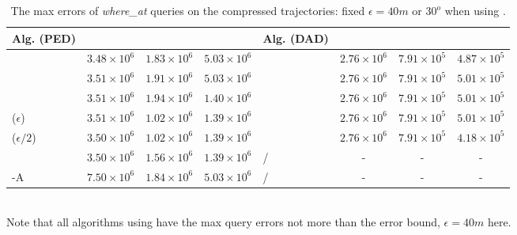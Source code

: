 {\begin{table}
	\caption{\small The max errors of {\emph{where\_at}} queries on the compressed trajectories: fixed $\epsilon=40m$ or $30^o$ when using \dad.}
	\centering
	\scriptsize
	\begin{tabular}{|l|c|c|c|l|c|c|c|}
		\hline
		\bf{Alg. (PED)}  &\ucar &\geolife &\mopsi & \bf{Alg. (DAD)}  &\ucar &\geolife &\mopsi \\
		\hline
		{\dpa} &	$3.48 \times 10^6$ & $1.83 \times 10^6$ &	$5.03 \times 10^6$	& \dpa	& $2.76 \times 10^6$	& $7.91 \times 10^5$	& $4.87 \times 10^5$ \\
		\hline
		{\tpa} &	$3.51 \times 10^6$ & $1.91 \times 10^6$ &	$5.03 \times 10^6$	& \tpa	& $2.76 \times 10^6$	& $7.91 \times 10^5$	& $5.01 \times 10^5$ \\
		\hline
		{\bqsa} &	$3.51 \times 10^6$ & $1.94 \times 10^6$ &	$1.40 \times 10^6$	& \opwa	& $2.76 \times 10^6$	& $7.91 \times 10^5$	& $5.01 \times 10^5$ \\
		\hline
		{\siped($\epsilon$)} &	$3.51 \times 10^6$ & $1.02 \times 10^6$ &	$1.39 \times 10^6$	& \interval	& $2.76 \times 10^6$	& $7.91 \times 10^5$	& $5.01 \times 10^5$ \\
		\hline
		{\siped($\epsilon/2$)} &	$3.50 \times 10^6$ & $1.02 \times 10^6$ &	$1.39 \times 10^6$	& \intersec	& $2.76 \times 10^6$	& $7.91 \times 10^5$	& $4.18 \times 10^5$ \\
		\hline
		{\operb} &	$3.50 \times 10^6$ & $1.56 \times 10^6$ &	$1.39 \times 10^6$	& / & -  & - & -  \\
		\hline
		{\operb-A} &	${7.50\times 10^6} $ & ${1.84\times 10^6} $ & ${5.03\times 10^6} $ & / &- &- &- \\
		\hline
	\end{tabular}
	\label{tab:query-me}
	\vspace{0.5ex}
	\\{Note that all algorithms using \sed have the max query errors not more than the error bound, \ie $\epsilon=40m$ here.}
	\vspace{-1ex}
\end{table} 	


}
